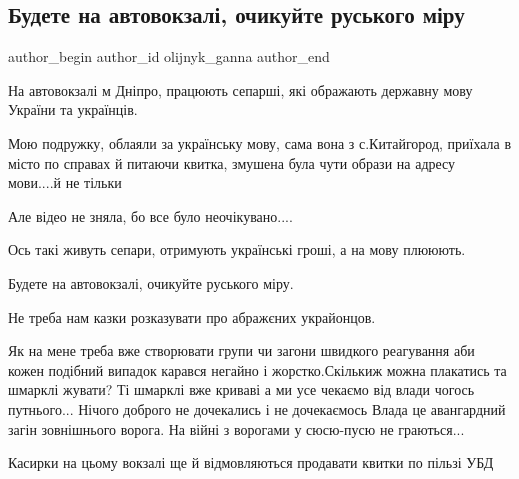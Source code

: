  
 
 
 
 
 
\subsection{Будете на автовокзалі, очикуйте руського міру}
\label{sec:26_07_2021.fb.olijnyk_ganna.1.rusmir_avtovokzal}
 
\ifcmt
 author_begin
   author_id olijnyk_ganna
 author_end
\fi

На автовокзалі м Дніпро,  працюють сепарші, які ображають державну мову України
та українців.

Мою подружку, облаяли за українську мову, сама вона з с.Китайгород, приїхала в
місто по справах й питаючи квитка, змушена була чути образи на адресу мови....й
не тільки

Але відео не зняла, бо все було  неочікувано....

Ось такі живуть сепари, отримують українські гроші, а на мову плююють.

Будете на автовокзалі, очикуйте руського міру.

\begin{itemize}
 
Не треба нам казки розказувати про абражєних украйонцов.

 

Як на мене треба вже створювати групи чи загони швидкого реагування аби кожен
подібний випадок карався негайно і жорстко.Скількиж можна плакатись та шмарклі
жувати? Ті шмарклі вже криваві а ми усе чекаємо від влади чогось
путнього... Нічого доброго не дочекались і не дочекаємось Влада це авангардний
загін зовнішнього ворога. На війні з ворогами у сюсю-пусю не граються...

 
Касирки на цьому вокзалі ще й відмовляються продавати квитки по пільзі УБД
\end{itemize}

